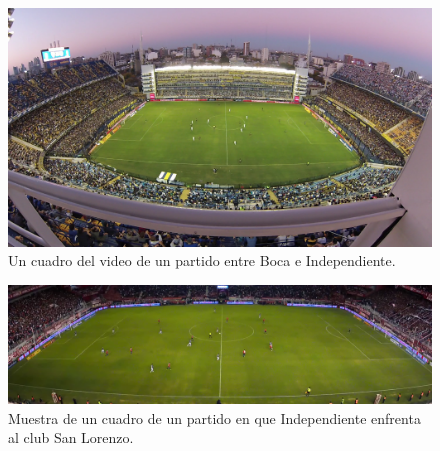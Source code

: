 \begin{figure}[H]
  \centering
  \includegraphics[width=\linewidth]{./images/boca-figura.png}
  \caption{Un cuadro del video de un partido entre Boca e Independiente.}
  \label{fig:boca-figura}
\end{figure}
\begin{figure}[H]
  \centering
  \includegraphics[width=\linewidth]{./images/independ-figura.png}
  \caption{Muestra de un cuadro de un partido en que Independiente enfrenta al club San Lorenzo.}
  \label{fig:independ-figura}
\end{figure}
